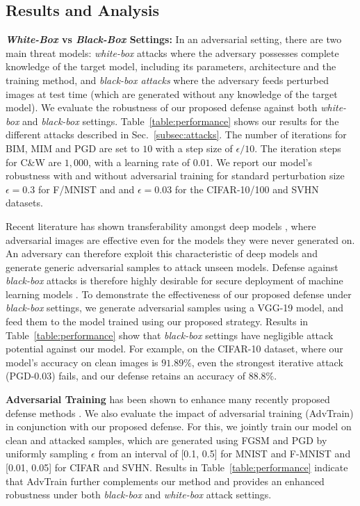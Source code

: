 \documentclass[10pt,twocolumn,letterpaper]{article}
\begin{document}
\subsection{Results and Analysis}

\noindent \textbf{\textit{White-Box} vs \textit{Black-Box} Settings:}
In an adversarial setting, there are two main threat models: \textit{white-box} attacks where the adversary possesses complete knowledge of the target model, including its parameters, architecture and the training method, and \textit{black-box attacks} where the adversary feeds perturbed images at test time (which are generated without any knowledge of the target model). We evaluate the robustness of our proposed defense against both \textit{white-box} and \textit{black-box} settings. Table~\ref{table:performance} shows our results for the different attacks described in Sec.~\ref{subsec:attacks}. The number of iterations for BIM, MIM and PGD are set to $10$ with a step size of $\epsilon/10$. The iteration steps for C\&W are $1,000$, with a learning rate of $0.01$. We report our model's robustness with and without adversarial training for standard perturbation size \ie $\epsilon = 0.3$ for F/MNIST and and $\epsilon = 0.03$ for the CIFAR-10/100 and SVHN datasets.

Recent literature has shown transferability amongst deep models \cite{tramer2017space,kurakin2016adversarial_2,43405}, where adversarial images are effective even for the models they were never generated on. An adversary can therefore exploit this characteristic of deep models and generate generic adversarial samples to attack unseen models. Defense against \textit{black-box} attacks is therefore highly desirable for secure deployment of machine learning models \cite{papernot2016limitations}. To demonstrate the effectiveness of our proposed defense under \textit{black-box} settings, we generate adversarial samples using a VGG-19 model, and feed them to the model trained using our proposed strategy. Results in Table~\ref{table:performance} show that \textit{black-box} settings have negligible attack potential against our model. For example, on the CIFAR-10 dataset, where our model's accuracy on clean images is $91.89\%$, even the strongest iterative attack (PGD-0.03) fails, and our defense retains an accuracy of $88.8\%$.


\noindent \textbf{Adversarial Training} has been shown to enhance many recently proposed defense methods \cite{kurakin2018adversarial}. We also evaluate the impact of adversarial training (AdvTrain) in conjunction with our proposed defense. For this, we jointly train our model on clean and attacked samples, which are generated using FGSM \cite{43405} and PGD \cite{madry2017towards} by uniformly sampling $\epsilon$ from an interval of [0.1, 0.5] for MNIST and F-MNIST and [0.01, 0.05] for CIFAR and SVHN. Results in Table~\ref{table:performance} indicate that AdvTrain further complements our method and provides an enhanced robustness under both \textit{black-box} and \textit{white-box} attack settings.
\end{document}
